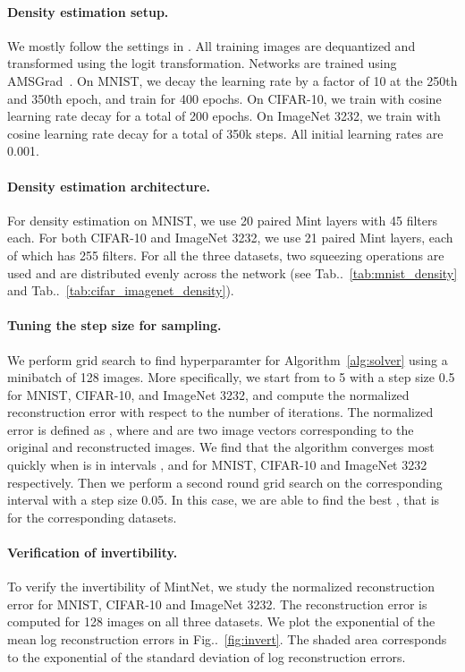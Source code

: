 \documentclass{article}
\makeatletter
\def\@onedot{\ifx\@let@token.\else.\null\fi\xspace}
\DeclareRobustCommand\onedot{\futurelet\@let@token\@onedot}
\newcommand{\figref}[1]{Fig\onedot~\ref{#1}}
\newcommand{\algoref}[1]{Algorithm~\ref{#1}}
\newcommand{\tabref}[1]{Tab\onedot~\ref{#1}}
\makeatother
\begin{document}
\paragraph{Density estimation setup.}
We mostly follow the settings in \cite{maf}. All training images are dequantized and transformed using the logit transformation. Networks are trained using AMSGrad~\cite{amsgrad}. On MNIST, we decay the learning rate by a factor of 10 at the 250th and 350th epoch, and train for 400 epochs. On CIFAR-10, we train with cosine learning rate decay for a total of 200 epochs. On ImageNet 3232, we train with cosine learning rate decay for a total of 350k steps. All initial learning rates are 0.001. 

\paragraph{Density estimation architecture.}
For density estimation on MNIST, we use 20 paired Mint layers with 45 filters each. For both CIFAR-10 and ImageNet 3232, we use 21 paired Mint layers, each of which has 255 filters. For all the three datasets, two squeezing operations are used and are distributed evenly across the network  (see \tabref{tab:mnist_density} and \tabref{tab:cifar_imagenet_density}). 

\paragraph{Tuning the step size for sampling.}
We perform grid search to find hyperparamter  for \algoref{alg:solver} using a minibatch of 128 images. More specifically, we start from  to 5 with a step size 0.5 for MNIST, CIFAR-10, and ImageNet 3232, and compute the normalized  reconstruction error with respect to the number of iterations. The normalized  error is defined as , where  and  are two image vectors corresponding to the original and reconstructed images. We find that the algorithm converges most quickly when  is in intervals ,  and  for MNIST, CIFAR-10 and ImageNet 3232 respectively. Then we perform a second round grid search on the corresponding interval with a step size 0.05. In this case, we are able to find the best , that is  for the corresponding datasets.

\paragraph{Verification of invertibility.}
To verify the invertibility of MintNet, we study the normalized  reconstruction error for MNIST, CIFAR-10 and ImageNet 3232. The  reconstruction error is computed for 128 images on all three datasets. We plot the exponential of the mean log reconstruction errors in \figref{fig:invert}. The shaded area corresponds to the exponential of the standard deviation of log reconstruction errors.
\end{document}
